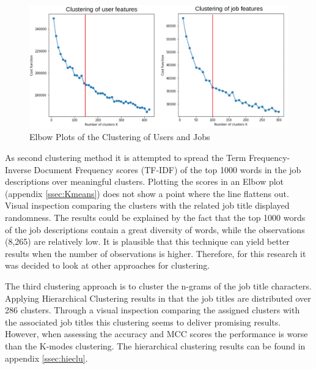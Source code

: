 \begin{figure}[h]
    \centering
    \includegraphics[width=\linewidth]{ThesisTemplate/Images/Clustering.png}
    \caption{\label{fig:eb} \footnotesize{Elbow Plots of the Clustering of Users and Jobs}}
\end{figure}

As second clustering method it is attempted to spread the Term Frequency-Inverse Document Frequency scores (TF-IDF) of the top 1000 words in the job descriptions over meaningful clusters.
Plotting the scores in an Elbow plot (appendix \ref{ssec:Kmeans}) does not show a point where the line flattens out.
Visual inspection comparing the clusters with the related job title displayed randomness.
The results could be explained by the fact that the top 1000 words of the job descriptions contain a great diversity of words, while the observations (8,265) are relatively low.
It is plausible that this technique can yield better results when the number of observations is higher.
Therefore, for this research it was decided to look at other approaches for clustering.

The third clustering approach is to cluster the n-grams of the job title characters.
Applying Hierarchical Clustering results in that the job titles are distributed over 286 clusters. 
Through a visual inspection comparing the assigned clusters with the associated job titles this clustering seems to deliver promising results.
However, when assessing the accuracy and MCC scores the performance is worse than the K-modes clustering.
The hierarchical clustering results can be found in appendix \ref{ssec:hieclu}.


